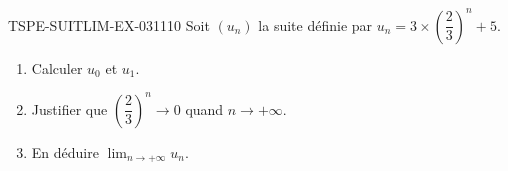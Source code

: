 \begin{exercice}{TSPE-SUITLIM-EX-031}{1}{10}
Soit $(u_n)$ la suite définie par $u_n = 3 \times \left(\dfrac{2}{3}\right)^n + 5$.
\begin{enumerate}
  \item Calculer $u_0$ et $u_1$.
  \item Justifier que $\left(\dfrac{2}{3}\right)^n \to 0$ quand $n \to +\infty$.
  \item En déduire $\lim_{n \to +\infty} u_n$.
\end{enumerate}
\end{exercice}
